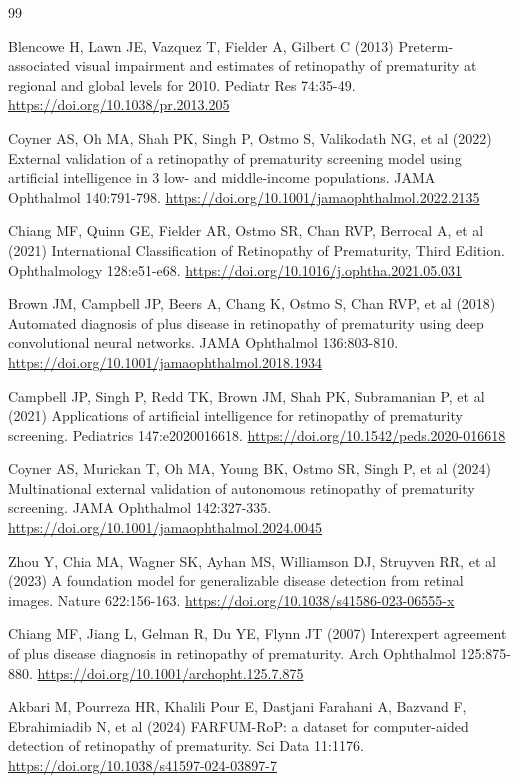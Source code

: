 \documentclass[pdflatex,sn-vancouver,Numbered,iicol]{sn-jnl}
\begin{document}
\begin{thebibliography}{99}

Blencowe H, Lawn JE, Vazquez T, Fielder A, Gilbert C (2013)
Preterm-associated visual impairment and estimates of retinopathy of prematurity
at regional and global levels for 2010. Pediatr Res 74:35-49.
\url{https://doi.org/10.1038/pr.2013.205}

Coyner AS, Oh MA, Shah PK, Singh P, Ostmo S, Valikodath NG, et al (2022)
External validation of a retinopathy of prematurity screening model using
artificial intelligence in 3 low- and middle-income populations. JAMA Ophthalmol
140:791-798. \url{https://doi.org/10.1001/jamaophthalmol.2022.2135}

Chiang MF, Quinn GE, Fielder AR, Ostmo SR, Chan RVP, Berrocal A, et al (2021)
International Classification of Retinopathy of Prematurity, Third Edition.
Ophthalmology 128:e51-e68. \url{https://doi.org/10.1016/j.ophtha.2021.05.031}

Brown JM, Campbell JP, Beers A, Chang K, Ostmo S, Chan RVP, et al (2018)
Automated diagnosis of plus disease in retinopathy of prematurity using deep
convolutional neural networks. JAMA Ophthalmol 136:803-810.
\url{https://doi.org/10.1001/jamaophthalmol.2018.1934}

Campbell JP, Singh P, Redd TK, Brown JM, Shah PK, Subramanian P, et al (2021)
Applications of artificial intelligence for retinopathy of prematurity screening.
Pediatrics 147:e2020016618. \url{https://doi.org/10.1542/peds.2020-016618}

Coyner AS, Murickan T, Oh MA, Young BK, Ostmo SR, Singh P, et al (2024)
Multinational external validation of autonomous retinopathy of prematurity
screening. JAMA Ophthalmol 142:327-335.
\url{https://doi.org/10.1001/jamaophthalmol.2024.0045}

Zhou Y, Chia MA, Wagner SK, Ayhan MS, Williamson DJ, Struyven RR, et al (2023)
A foundation model for generalizable disease detection from retinal images.
Nature 622:156-163. \url{https://doi.org/10.1038/s41586-023-06555-x}

Chiang MF, Jiang L, Gelman R, Du YE, Flynn JT (2007) Interexpert agreement of
plus disease diagnosis in retinopathy of prematurity. Arch Ophthalmol
125:875-880. \url{https://doi.org/10.1001/archopht.125.7.875}

Akbari M, Pourreza HR, Khalili Pour E, Dastjani Farahani A, Bazvand F,
Ebrahimiadib N, et al (2024) FARFUM-RoP: a dataset for computer-aided detection
of retinopathy of prematurity. Sci Data 11:1176.
\url{https://doi.org/10.1038/s41597-024-03897-7}


\end{thebibliography}
\end{document}
